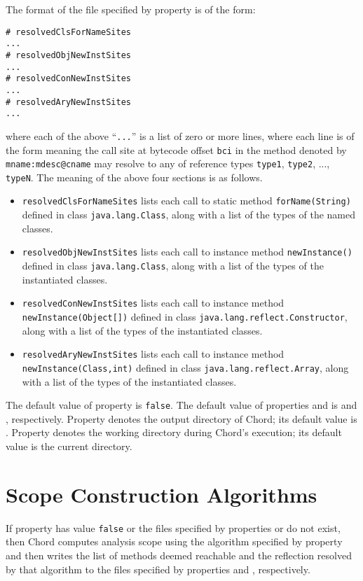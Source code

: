 The format of the file specified by property 
is of the form:
\begin{verbatim}
# resolvedClsForNameSites
...
# resolvedObjNewInstSites
...
# resolvedConNewInstSites
...
# resolvedAryNewInstSites
...
\end{verbatim}
where each of the above ``{\tt ...}'' is a list of zero or more lines, where
each line is of the form
meaning the call site at bytecode offset {\tt bci} in the
method denoted by {\tt mname:mdesc@cname} may resolve to any of
reference types {\tt type1}, {\tt type2}, ..., {\tt typeN}.
The meaning of the above four sections is as follows.
\begin{itemize}
\item {\tt resolvedClsForNameSites} lists
each call to static method {\tt forName(String)} defined in class
{\tt java.lang.Class}, along with a list of the types of the named
classes.
\item {\tt resolvedObjNewInstSites} lists
each call to instance method {\tt newInstance()} defined in class
{\tt java.lang.Class}, along with a list of the types of the
instantiated classes.
\item {\tt resolvedConNewInstSites} lists
each call to instance method {\tt newInstance(Object[])} defined in class
{\tt java.lang.reflect.Constructor}, along with a list of the types of the
instantiated classes.
\item {\tt resolvedAryNewInstSites} lists
each call to instance method {\tt newInstance(Class,int)} defined in class
{\tt java.lang.reflect.Array}, along with a list of the types of the
instantiated classes.
\end{itemize}
The default value of property  is {\tt false}.
The default value of properties  and
 is  and
, respectively.
Property  denotes the output directory of Chord;
its default value is .
Property  denotes the working directory during
Chord's execution; its default value is the current directory.

\section{Scope Construction Algorithms}
\label{sec:scope-algos}

If property  has value {\tt false} or the
files specified by properties  or
 do not exist, then Chord computes analysis
scope using the algorithm specified by property
 and then writes the list of methods deemed
reachable and the reflection resolved by that algorithm to the files
specified by properties  and
, respectively.

